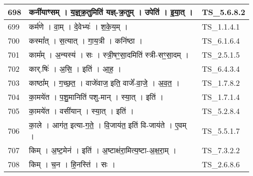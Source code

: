 \documentclass[17pt]{extarticle}
\begin{document}
\begin{longtable}{||p{0.4in}||p{4.9in}||p{0.9in}||}
    \hline
        
    698 & कनी॑याꣳसम्   ।   य॒ज्ञ्॒क्र॒तुमिति॑ यज्ञ्{-}क्र॒तुम्   ।   उपेति॑   ।   इ॒या॒त्   ।    & TS\_5.6.8.2       \\
    
    \hline
        
    699 & कर्म॑णे   ।   वा॒म्   ।   दे॒वेभ्यः॑   ।   श॒के॒य॒म्   ।    & TS\_1.1.4.1       \\
    
    \hline
        
    700 & कस्मा᳚त्   ।   स॒त्यात्   ।   गा॒य॒त्री   ।   कनि॑ष्ठा   ।    & TS\_6.1.6.4       \\
    
    \hline
        
    701 & काम᳚म्   ।   अ॒न्यस्य॑   ।   सः   ।   स्त्री॒षꣳ॒॒सा॒दमिति॑ स्त्री{-}सꣳ॒॒सा॒दम्   ।    & TS\_2.5.1.5       \\
    
    \hline
        
    702 & कार्.षिः॑   ।   अ॒सि॒   ।   इति॑   ।   आ॒ह॒   ।    & TS\_6.4.3.4       \\
    
    \hline
        
    703 & काष्ठा᳚म्   ।   ग॒च्छ॒त॒   ।   वाजे॑वाज॒ इति॒ वाजे᳚{-}वा॒जे॒   ।   अ॒व॒त॒   ।    & TS\_1.7.8.2       \\
    
    \hline
        
    704 & का॒मये॑त   ।   प॒शु॒मानिति॑ पशु{-}मान्   ।   स्या॒त्   ।   इति॑   ।    & TS\_1.7.1.4       \\
    
    \hline
        
    705 & का॒मये॑त   ।   वसी॑यान्   ।   स्या॒त्   ।   इति॑   ।    & TS\_5.2.8.4       \\
    
    \hline
        
    706 & का॒ले   ।   आग॑त॒ इत्या{-}ग॒ते॒   ।   वि॒जाय॑त॒ इति॑ वि{-}जाय॑ते   ।   ए॒वम्   ।    & TS\_5.5.1.7       \\
    
    \hline
        
    707 & किम्   ।   अ॒ष्ट॒मेन॑   ।   इति॑   ।   अ॒ष्टाक्ष॑रा॒मित्य॒ष्टा{-}अ॒क्ष॒रा॒म्   ।    & TS\_7.3.2.2       \\
    
    \hline
        
    708 & किम्   ।   च॒न   ।   हि॒नस्ति॑   ।   सः   ।    & TS\_2.6.8.6       \\
    

\end{longtable}
\end{document}
